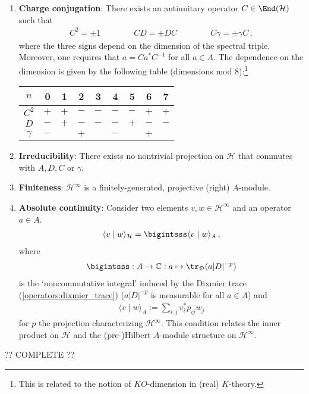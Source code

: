 \begin{remark}
\begin{enumerate}
            \item\textbf{Charge conjugation}: There exists an antiunitary operator $C\in\End(\mathcal{H})$ such that
            \begin{gather}
                C^2=\pm1\qquad\qquad CD=\pm DC\qquad\qquad C\gamma=\pm\gamma C\,,
            \end{gather}
            where the three signs depend on the dimension of the spectral triple. Moreover, one requires that $a=Ca^*C^{-1}$ for all $a\in A$. The dependence on the dimension is given by the following table (dimensions mod 8):\footnote{This is related to the notion of $K\!O$-dimension in (real) $K$-theory.}
            \begin{center}
                \begin{tabular}{|c|c|c|c|c|c|c|c|c|}
                    \hline
                    $n$&0&1&2&3&4&5&6&7\\
                    \hline
                    $C^2$&$+$&$+$&$-$&$-$&$-$&$-$&$+$&$+$\\
                    \hline
                    $D$&$-$&$+$&$-$&$-$&$-$&$+$&$-$&$-$\\
                    \hline
                    $\gamma$&$-$&&$+$&&$-$&&$+$&\\
                    \hline
                \end{tabular}
            \end{center}
            \item\textbf{Irreducibility}: There exists no nontrivial projection on $\mathcal{H}$ that commutes with $A,D,C$ or $\gamma$.
            \item\textbf{Finiteness}: $\mathcal{H}^\infty$ is a finitely-generated, projective (right) $A$-module.
            \item\textbf{Absolute continuity}: Consider two elements $v,w\in\mathcal{H}^\infty$ and an operator $a\in A$.
                \begin{gather}
                    \langle v\mid w \rangle_{\mathcal{H}} = \bigintsss\langle v\mid w \rangle_A\,,
                \end{gather}
                where
                \begin{gather}
                    \bigintsss:A\rightarrow\mathbb{C}:a\mapsto\tr_{\mathfrak{D}}(a|D|^{-p})
                \end{gather}
                is the `noncommutative integral' induced by the Dixmier trace (\cref{operators:dixmier_trace}) ($a|D|^{-p}$ is measurable for all $a\in A$) and
                \begin{gather}
                    \langle v\mid w \rangle_A := \sum_{i,j} v^*_ip_{ij}w_j
                \end{gather}
                for $p$ the projection characterizing $\mathcal{H}^\infty$. This condition relates the inner product on $\mathcal{H}$ and the (pre-)Hilbert $A$-module structure on $\mathcal{H}^\infty$.
        \end{enumerate}
        ?? COMPLETE ??
    \end{remark}

